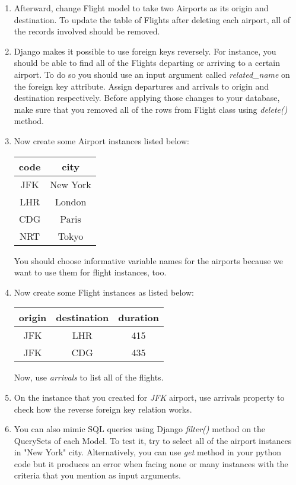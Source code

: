 \documentclass{homework}
\begin{document}
\begin{enumerate}[label=\roman*)]
    \item Afterward, change Flight model to take two Airports as its origin and destination. To update the table of Flights after deleting each airport, all of the records involved should be removed.
    \item Django makes it possible to use foreign keys reversely. For instance, you should be able to find all of the Flights departing or arriving to a certain airport.
    To do so you should use an input argument called \textit{related\_name} on the foreign key attribute. Assign departures and arrivals to origin and destination respectively. Before applying those changes to your database, make sure that you removed all of the rows from Flight class using \textit{delete()} method.
    \item Now create some Airport instances listed below:
    \begin{table}[h]
        \begin{tabular}{|c|c|}
        \hline
         code & city\\
         \hline
         JFK & New York \\
         LHR & London   \\
         CDG & Paris    \\
         NRT & Tokyo    \\ 
        \hline
        \end{tabular}
    \end{table}
    You should choose informative variable names for the airports because we want to use them for flight instances, too.
    \item Now create some Flight instances as listed below:
    \begin{table}[h]
        \begin{tabular}{|c|c|c|}
        \hline
         origin & destination & duration\\
         \hline
         JFK & LHR & 415 \\
         JFK & CDG & 435  \\ 
        \hline
        \end{tabular}
    \end{table}
    Now, use \textit{arrivals} to list all of the flights.
    \item On the instance that you created for \textit{JFK} airport, use arrivals property to check how the reverse foreign key relation works.
    \item You can also mimic SQL queries using Django \textit{filter()} method on the QuerySets of each Model. To test it, try to select all of the airport instances in "New York" city. Alternatively, you can use \textit{get} method in your python code but it produces an error when facing none or many instances with the criteria that you mention as input arguments.

\end{enumerate}
\end{document}
